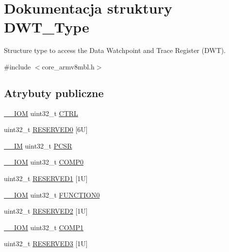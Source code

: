 \hypertarget{struct_d_w_t___type}{}\section{Dokumentacja struktury D\+W\+T\+\_\+\+Type}
\label{struct_d_w_t___type}


Structure type to access the Data Watchpoint and Trace Register (D\+WT).  




{\ttfamily \#include $<$core\+\_\+armv8mbl.\+h$>$}

\subsection*{Atrybuty publiczne}
\begin{DoxyCompactItemize}
\item 
\hyperlink{core__sc300_8h_ab6caba5853a60a17e8e04499b52bf691}{\+\_\+\+\_\+\+I\+OM} uint32\+\_\+t \hyperlink{struct_d_w_t___type_add790c53410023b3b581919bb681fe2a}{C\+T\+RL}
\item 
uint32\+\_\+t \hyperlink{struct_d_w_t___type_a383c3272908da383b6e23a059007f728}{R\+E\+S\+E\+R\+V\+E\+D0} \mbox{[}6\+U\mbox{]}
\item 
\hyperlink{core__sc300_8h_a4cc1649793116d7c2d8afce7a4ffce43}{\+\_\+\+\_\+\+IM} uint32\+\_\+t \hyperlink{struct_d_w_t___type_a6353ca1d1ad9bc1be05d3b5632960113}{P\+C\+SR}
\item 
\hyperlink{core__sc300_8h_ab6caba5853a60a17e8e04499b52bf691}{\+\_\+\+\_\+\+I\+OM} uint32\+\_\+t \hyperlink{struct_d_w_t___type_a61c2965af5bc0643f9af65620b0e67c9}{C\+O\+M\+P0}
\item 
uint32\+\_\+t \hyperlink{struct_d_w_t___type_af4ad5239d7d9b1990005f75464754594}{R\+E\+S\+E\+R\+V\+E\+D1} \mbox{[}1\+U\mbox{]}
\item 
\hyperlink{core__sc300_8h_ab6caba5853a60a17e8e04499b52bf691}{\+\_\+\+\_\+\+I\+OM} uint32\+\_\+t \hyperlink{struct_d_w_t___type_a579ae082f58a0317b7ef029b20f52889}{F\+U\+N\+C\+T\+I\+O\+N0}
\item 
uint32\+\_\+t \hyperlink{struct_d_w_t___type_a61fdbdfbc267bb6ae3b5cff18f406f2f}{R\+E\+S\+E\+R\+V\+E\+D2} \mbox{[}1\+U\mbox{]}
\item 
\hyperlink{core__sc300_8h_ab6caba5853a60a17e8e04499b52bf691}{\+\_\+\+\_\+\+I\+OM} uint32\+\_\+t \hyperlink{struct_d_w_t___type_a38714af6b7fa7c64d68f5e1efbe7a931}{C\+O\+M\+P1}
\item 
uint32\+\_\+t \hyperlink{struct_d_w_t___type_a7d29e03e23883440d96cac784c5a4958}{R\+E\+S\+E\+R\+V\+E\+D3} \mbox{[}1\+U\mbox{]}

\end{DoxyCompactItemize}
